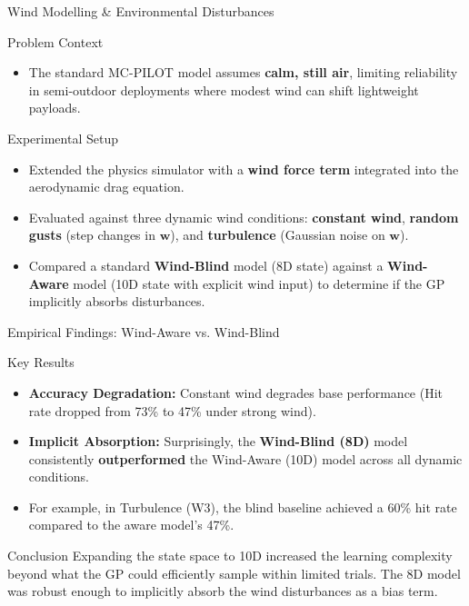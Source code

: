 \documentclass{if-beamer}
\begin{document}
\begin{frame}{Wind Modelling \& Environmental Disturbances}
    \begin{alertblock}{Problem Context}
        \begin{itemize}
            \item The standard MC-PILOT model assumes \textbf{calm, still air}, limiting reliability in semi-outdoor deployments where modest wind can shift lightweight payloads.
        \end{itemize}
    \end{alertblock}
    \begin{block}{Experimental Setup}
        \begin{itemize}
            \item Extended the physics simulator with a \textbf{wind force term} integrated into the aerodynamic drag equation.
            \item Evaluated against three dynamic wind conditions: \textbf{constant wind}, \textbf{random gusts} (step changes in $\mathbf{w}$), and \textbf{turbulence} (Gaussian noise on $\mathbf{w}$).
            \item Compared a standard \textbf{Wind-Blind} model (8D state) against a \textbf{Wind-Aware} model (10D state with explicit wind input) to determine if the GP implicitly absorbs disturbances.
        \end{itemize}
    \end{block}
\end{frame}

\begin{frame}{Empirical Findings: Wind-Aware vs. Wind-Blind}
    \begin{block}{Key Results}
        \begin{itemize}
            \item \textbf{Accuracy Degradation:} Constant wind degrades base performance (Hit rate dropped from 73\% to 47\% under strong wind).
            \item \textbf{Implicit Absorption:} Surprisingly, the \textbf{Wind-Blind (8D)} model consistently \textbf{outperformed} the Wind-Aware (10D) model across all dynamic conditions.
            \item For example, in Turbulence (W3), the blind baseline achieved a 60\% hit rate compared to the aware model's 47\%.
        \end{itemize}
    \end{block}
    \begin{alertblock}{Conclusion}
        Expanding the state space to 10D increased the learning complexity beyond what the GP could efficiently sample within limited trials. The 8D model was robust enough to implicitly absorb the wind disturbances as a bias term.
    \end{alertblock}
\end{frame}
\end{document}
